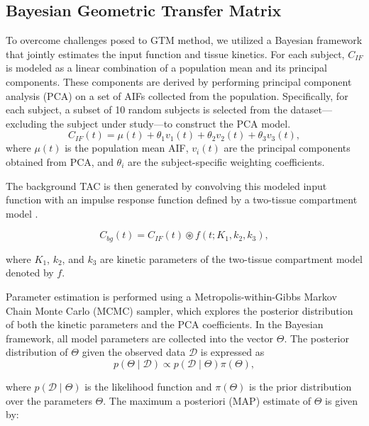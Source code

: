 \subsection{Bayesian Geometric Transfer Matrix}
To overcome challenges posed to GTM method, we utilized a Bayesian framework that jointly estimates the input function and tissue kinetics.
For each subject, $C_{IF}$ is modeled as a linear combination of a population mean and its principal components.
These components are derived by performing principal component analysis (PCA) on a set of AIFs collected from the population. Specifically, for each subject, a subset of 10 random subjects is selected from the dataset—excluding the subject under study—to construct the PCA model.
\begin{equation}
	C_{IF}(t) = \mu(t) + \theta_{1} v_{1}(t) + \theta_{2} v_{2}(t) + \theta_{3} v_{3}(t),
\end{equation}
where \(\mu(t)\) is the population mean AIF, \(v_{i}(t)\) are the principal components obtained from PCA, and \(\theta_{i}\) are the subject-specific weighting coefficients.

The background TAC is then generated by convolving this modeled input function with an impulse response function defined by a two-tissue compartment model \cite{jouvie2013estimation}.

\begin{equation}
	C_{bg}(t) = C_{IF}(t) \circledast f(t; K_1, k_2, k_3),
\end{equation}

where $K_1$, $k_2$, and $k_3$ are kinetic parameters of the two-tissue compartment model denoted by $f$.

Parameter estimation is performed using a Metropolis-within-Gibbs Markov Chain Monte Carlo (MCMC) sampler, which explores the posterior distribution of both the kinetic parameters and the PCA coefficients.
In the Bayesian framework, all model parameters are collected into the vector $\Theta$. The posterior distribution of $\Theta$ given the observed data $\mathcal{D}$ is expressed as
\begin{equation}
	p(\Theta \mid \mathcal{D}) \propto p(\mathcal{D} \mid \Theta) \pi(\Theta),
\end{equation}

where \( p(\mathcal{D} \mid \Theta) \) is the likelihood function and \( \pi(\Theta) \) is the prior distribution over the parameters \( \Theta \). The maximum a posteriori (MAP) estimate of \( \Theta \) is given by:

